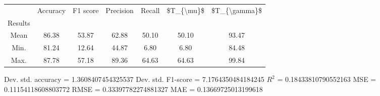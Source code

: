 \begin{tabular}{|c|c|c|c|c|c|c|}
\toprule
{} &  Accuracy &  F1 score &  Precision &  Recall &  \$T\_\{\textbackslash mu\}\$ &  \$T\_\{\textbackslash gamma\}\$ \\
Results &           &           &            &         &            &               \\
\hline
Mean    &     86.38 &     53.87 &      62.88 &   50.10 &      50.10 &         93.47 \\
Min.    &     81.24 &     12.64 &      44.87 &    6.80 &       6.80 &         84.48 \\
Max.    &     87.78 &     57.18 &      89.36 &   64.63 &      64.63 &         99.84 \\
\bottomrule
\end{tabular}

 Dev. std. accuracy = 1.3608407454325537
 Dev. std. F1-score = 7.1764350484184245
 $R^2$ = 0.18433810790552163
 MSE = 0.11154118608803772
 RMSE = 0.33397782274881327
 MAE = 0.13669725013199618